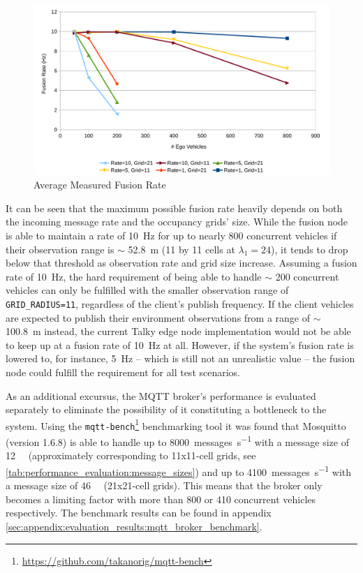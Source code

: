 \begin{figure}
	\centering
	\includegraphics[width=1.0\linewidth]{98_images/performance_evaluation_chart1.pdf}
	\caption{Average Measured Fusion Rate}
	\label{fig:performance_evaluation:fusion_rates}
\end{figure}

It can be seen that the maximum possible fusion rate heavily depends on both the incoming message rate and the occupancy grids' size. While the fusion node is able to maintain a rate of \SI{10}{\hertz} for up to nearly 800 concurrent vehicles if their observation range is $\sim$ \SI{52.8}{\meter} (11 by 11 cells at $\lambda_1 = 24$), it tends to drop below that threshold as observation rate and grid size increase. Assuming a fusion rate of \SI{10}{\hertz}, the hard requirement of being able to handle $\sim$ 200 concurrent vehicles can only be fulfilled with the smaller observation range of \texttt{GRID\_RADIUS=11}, regardless of the client's publish frequency. If the client vehicles are expected to publish their environment observations from a range of $\sim$ \SI{100.8}{\meter} instead, the current Talky edge node implementation would not be able to keep up at a fusion rate of \SI{10}{\hertz} at all. However, if the system's fusion rate is lowered to, for instance, \SI{5}{\hertz} – which is still not an unrealistic value – the fusion node could fulfill the requirement for all test scenarios.

As an additional excursus, the MQTT broker's performance is evaluated separately to eliminate the possibility of it constituting a bottleneck to the system. Using the \texttt{mqtt-bench}\footnote{\url{https://github.com/takanorig/mqtt-bench}} benchmarking tool it was found that Mosquitto (version 1.6.8) is able to handle up to \SI{8000}{messages\per\second} with a message size of \SI{12}{\kilo\byte} (approximately corresponding to 11x11-cell grids, see \cref{tab:performance_evaluation:message_sizes}) and up to \SI{4100}{messages\per\second} with a message size of \SI{46}{\kilo\byte} (21x21-cell grids). This means that the broker only becomes a limiting factor with more than 800 or 410 concurrent vehicles respectively. The benchmark results can be found in appendix \cref{sec:appendix:evaluation_results:mqtt_broker_benchmark}.
\par
\bigskip

